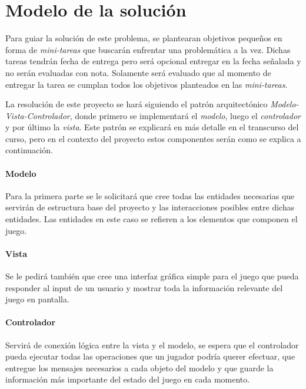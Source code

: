 \section{Modelo de la solución}
  Para guiar la solución de este problema, se plantearan objetivos pequeños en forma de 
  \textit{mini-tareas} que buscarán enfrentar una problemática a la vez.
  Dichas tareas tendrán fecha de entrega pero será opcional entregar en la fecha señalada y no serán
  evaluadas con nota.
  Solamente será evaluado que al momento de entregar la tarea se cumplan todos los objetivos 
  planteados en las \textit{mini-tareas}.

  La resolución de este proyecto se hará siguiendo el patrón arquitectónico 
  \textit{Modelo-Vista-Controlador}\footnotemark, donde primero se implementará el 
  \textit{modelo}, luego el \textit{controlador} y por último la \textit{vista}.
  Este patrón se explicará en más detalle en el transcurso del curso, pero en el 
  contexto del proyecto estos componentes serán como se explica a continuación.

  \paragraph{Modelo}
    Para la primera parte se le solicitará que cree todas las entidades necesarias que
    servirán de estructura base del proyecto y las interacciones posibles entre dichas
    entidades.
    Las entidades en este caso se refieren a los elementos que componen el juego.

  \paragraph{Vista}
    Se le pedirá también que cree una interfaz gráfica simple para el juego que pueda 
    responder al input de un usuario y mostrar toda la información relevante del juego en
    pantalla.

  \paragraph{Controlador}
    Servirá de conexión lógica entre la vista y el modelo, se espera que el controlador 
    pueda ejecutar todas las operaciones que un jugador podría querer efectuar, que 
    entregue los mensajes necesarios a cada objeto del modelo y que guarde la 
    información más importante del estado del juego en cada momento.
%